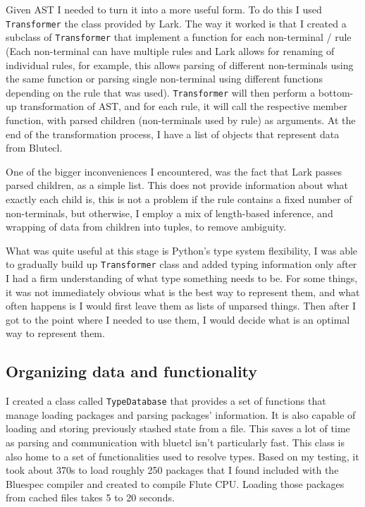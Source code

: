 \documentclass[12pt]{report}
\begin{document}
Given AST I needed to turn it into a more useful form. To do this I used \verb!Transformer! the class provided by Lark. The way it worked is that I created a subclass of \verb!Transformer! that implement a function for each non-terminal / rule (Each non-terminal can have multiple rules and Lark allows for renaming of individual rules, for example, this allows parsing of different non-terminals using the same function or parsing single non-terminal using different functions depending on the rule that was used). \verb!Transformer! will then perform a bottom-up transformation of AST, and for each rule, it will call the respective member function, with parsed children (non-terminals used by rule) as arguments. At the end of the transformation process, I have a list of objects that represent data from Blutecl.  
\par
One of the bigger inconveniences I encountered, was the fact that Lark passes parsed children, as a simple list. This does not provide information about what exactly each child is, this is not a problem if the rule contains a fixed number of non-terminals, but otherwise, I employ a mix of length-based inference, and wrapping of data from children into tuples, to remove ambiguity.  
\par
What was quite useful at this stage is Python's type system flexibility, I was able to gradually build up \verb!Transformer! class and added typing information only after I had a firm understanding of what type something needs to be. For some things, it was not immediately obvious what is the best way to represent them, and what often happens is I would first leave them as lists of unparsed things. Then after I got to the point where I needed to use them, I would decide what is an optimal way to represent them. 

\subsection{Organizing data and functionality}
I created a class called \verb!TypeDatabase! that provides a set of functions that manage loading packages and parsing packages' information. It is also capable of loading and storing previously stashed state from a  file. This saves a lot of time as parsing and communication with bluetcl isn't particularly fast. This class is also home to a set of functionalities used to resolve types. Based on my testing, it took about 370s to load roughly 250 packages that I found included with the Bluespec compiler and created to compile Flute CPU. Loading those packages from cached files takes 5 to 20 seconds.
\end{document}
